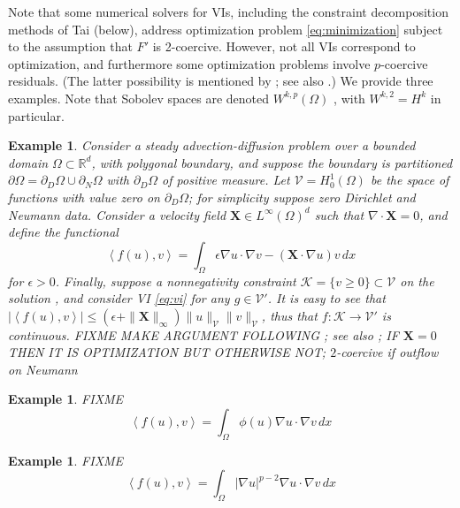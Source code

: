 \documentclass[letterpaper,final,12pt,reqno]{amsart}
\theoremstyle{cstyle}
\theoremstyle{dstyle}
\newtheorem{example}[theorem]{Example}
\numberwithin{equation}{section}
\numberwithin{figure}{section}
\numberwithin{table}{section}
\numberwithin{theorem}{section}
\newcommand{\eps}{\epsilon}
\newcommand{\RR}{\mathbb{R}}
\newcommand{\grad}{\nabla}
\newcommand{\Div}{\nabla\cdot}
\newcommand{\bX}{\mathbf{X}}
\newcommand{\cK}{\mathcal{K}}
\newcommand{\cV}{\mathcal{V}}
\newcommand{\ip}[2]{\left<#1,#2\right>}
\begin{document}
Note that some numerical solvers for VIs, including the constraint decomposition methods of Tai \cite{Tai2003} (below), address optimization problem \eqref{eq:minimization} subject to the assumption that $F'$ is 2-coercive.  However, not all VIs correspond to optimization, and furthermore some optimization problems involve $p$-coercive residuals.  (The latter possibility is mentioned by \cite{Tai2003}; see also \cite{TaiXu2002}.)  We provide three examples.  Note that Sobolev spaces are denoted $W^{k,p}(\Omega)$ \cite{Evans2010}, with $W^{k,2}=H^k$ in particular.

\begin{example}  \label{ex:advectiondiffusion}  Consider a steady advection-diffusion problem over a bounded domain $\Omega \subset \RR^d$, with polygonal boundary, and suppose the boundary is partitioned $\partial\Omega = \partial_D\Omega \cup \partial_N\Omega$ with $\partial_D\Omega$ of positive measure.  Let $\cV = H_0^1(\Omega)$ be the space of functions with value zero on $\partial_D\Omega$; for simplicity suppose zero Dirichlet and Neumann data.  Consider a velocity field $\bX \in L^\infty(\Omega)^d$ such that $\Div \bX=0$, and define the functional
\begin{equation}
\ip{f(u)}{v} = \int_\Omega \eps \grad u \cdot \grad v - (\bX \cdot \grad u) v\,dx \label{eq:advectiondiffusion}
\end{equation}
for $\eps>0$.  Finally, suppose a nonnegativity constraint $\cK = \{v\ge 0\} \subset \cV$ on the solution \cite[for example]{ChangNakshatrala2017}, and consider VI \eqref{eq:vi} for any $g\in\cV'$.  It is easy to see that $|\ip{f(u)}{v}| \le (\eps + \|\bX\|_\infty) \|u\|_{\cV} \|v\|_{\cV}$, thus that $f:\cK \to \cV'$ is continuous.  FIXME  MAKE ARGUMENT FOLLOWING \cite{Elmanetal2014}; see also \cite{Kirby2010}; IF $\bX=0$ THEN IT IS OPTIMIZATION BUT OTHERWISE NOT; $2$-coercive if outflow on Neumann
\end{example}

\begin{example}  \label{ex:porousgeneralization}  FIXME
\begin{equation}
\ip{f(u)}{v} = \int_\Omega \phi(u) \grad u \cdot \grad v\,dx \label{eq:porousgeneralization}
\end{equation}
\end{example}

\begin{example}  \label{ex:plaplacian}  FIXME
\begin{equation}
\ip{f(u)}{v} = \int_\Omega |\grad u|^{p-2} \grad u \cdot \grad v\,dx \label{eq:plaplacian}
\end{equation}
\end{example}
\end{document}
